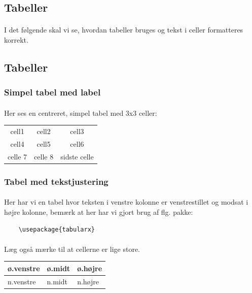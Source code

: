\documentclass{article}
\begin{document}
\begin{enumerate}
\section{Tabeller}
\paragraph{}
I det følgende skal vi se, hvordan tabeller bruges og tekst i celler formatteres korrekt.
\subsection{Tabeller}
\subsubsection{Simpel tabel med label}
\paragraph{}
Her ses en centreret, simpel tabel med 3x3 celler:
\begin{center}
\begin{tabular}{ c c c }
    cell1 & cell2 & cell3 \\
    cell4 & cell5 & cell6 \\
    celle 7 & celle 8 & sidste celle
\end{tabular}
\end{center}
\subsubsection{Tabel med tekstjustering}
\paragraph{}
Her har vi en tabel hvor teksten i venstre kolonne er venstrestillet og modsat i højre kolonne, bemærk at her har vi gjort brug af flg. pakke: 
\begin{verbatim}
    \usepackage{tabularx}\end{verbatim}
\paragraph{}
Læg også mærke til at cellerne er lige store.
\begin{center}
    \begin{tabularx}{0.6\textwidth} { 
        | >{\raggedright\arraybackslash}X 
        | >{\centering\arraybackslash}X 
        | >{\raggedleft\arraybackslash}X | }
       \hline
       ø.venstre & ø.midt & ø.højre \\
       \hline
       n.venstre  & n.midt  & n.højre  \\
      \hline
      \end{tabularx}
\end{center}

\end{enumerate}
\end{document}
